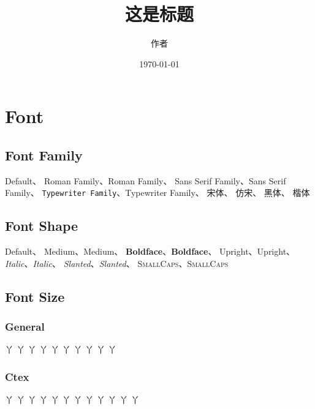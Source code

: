 \documentclass[UTF8]{ctexart}
\title{\heiti 这是标题}
\author{\kaishu 作者}
\date{\today}
\begin{document}
    \maketitle

    \section{Font}

    \subsection{Font Family}

    Default、
    \textrm{Roman Family}、{\rmfamily Roman Family}、
    \textsf{Sans Serif Family}、{\sffamily Sans Serif Family}、
    \texttt{Typewriter Family}、{\ttfamily Typewriter Family}、
    {\songti 宋体}、
    {\fangsong 仿宋}、
    {\heiti 黑体}、
    {\kaishu 楷体}

    \subsection{Font Shape}

    Default、
    \textmd{Medium}、{\mdseries Medium}、
    \textbf{Boldface}、{\bfseries Boldface}、
    \textup{Upright}、{\upshape Upright}、
    \textit{Italic}、{\itshape Italic}、
    \textsl{Slanted}、{\slshape Slanted}、
    \textsc{SmallCaps}、{\scshape SmallCaps}

    \subsection{Font Size}
    
    \subsubsection{General}

    {\tiny 丫}
    {\scriptsize 丫}
    {\footnotesize 丫}
    {\small 丫}
    {\normalsize 丫} %
    {\large 丫}
    {\Large 丫}
    {\LARGE 丫}
    {\huge 丫}
    {\Huge 丫}

    \subsubsection{Ctex}

    { 丫}
    { 丫}
    { 丫}
    { 丫}
    { 丫}
    { 丫}
    { 丫}
    { 丫}
    { 丫}
    { 丫}
    { 丫}
    { 丫}
\end{document}
